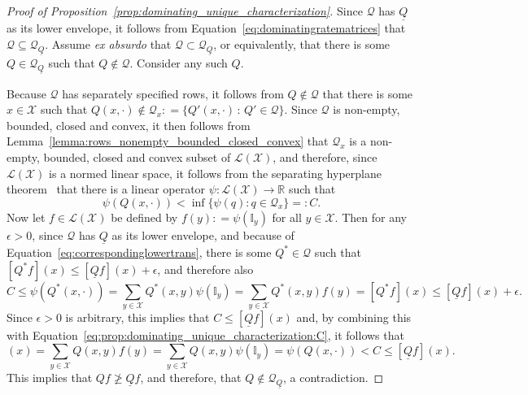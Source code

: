 \documentclass[10pt,a4paper]{paper}
\theoremstyle{definition}
\newcommand{\reals}{\mathbb{R}}
\newcommand{\states}{\mathcal{X}}
\newcommand{\gambles}{\mathcal{L}}
\newcommand{\gamblesX}{\gambles(\states)}
\newcommand{\ind}[1]{\mathbb{I}_{#1}}
\newcommand{\rateset}{\mathcal{Q}}
\newcommand{\lrate}{\underline{Q}}
\newcommand{\coloneqq}{:\!=}
\begin{document}
\begin{proof}[Proof of Proposition~\ref{prop:dominating_unique_characterization}]
Since $\rateset$ has $\lrate$ as its lower envelope, it follows from Equation~\eqref{eq:dominatingratematrices} that $\rateset\subseteq\rateset_{\lrate}$. Assume \emph{ex absurdo} that $\rateset\subset\rateset_{\lrate}$, or equivalently, that there is some $Q\in\rateset_{\lrate}$ such that $Q\notin\rateset$. Consider any such $Q$.

Because $\rateset$ has separately specified rows, it follows from $Q\notin\rateset$ that there is some $x\in\states$ such that $Q(x,\cdot)\notin\rateset_x\coloneqq\{Q'(x,\cdot)\,:\,Q'\in\rateset\}$. Since $\rateset$ is non-empty, bounded, closed and convex, it then follows from Lemma~\ref{lemma:rows_nonempty_bounded_closed_convex} that $\rateset_x$ is a non-empty, bounded, closed and convex subset of $\gamblesX$, and therefore, since $\gamblesX$ is a normed linear space, it follows from the separating hyperplane theorem~\cite[Chapter 14, Corollary 25]{Royden:2010vn} that there is a linear operator $\psi\colon\gamblesX\to\reals$ such that
\begin{equation}\label{eq:prop:dominating_unique_characterization:C}
\psi(Q(x,\cdot))<\inf\{\psi(q)\colon q\in\rateset_x\}=\colon C.
\end{equation}
Now let $f\in\gamblesX$ be defined by $f(y)\coloneqq\psi(\ind{y})$ for all $y\in\states$. Then for any $\epsilon>0$, since $\rateset$ has $\lrate$ as its lower envelope, and because of Equation~\eqref{eq:correspondinglowertrans}, there is some $Q^*\in\rateset$ such that $[Q^*f](x)\leq[\lrate f](x)+\epsilon$, and therefore also
\begin{equation*}
C
\leq\psi(Q^*(x,\cdot))
=\sum_{y\in\states}Q^*(x,y)\psi(\ind{y})
=\sum_{y\in\states}Q^*(x,y)f(y)
=[Q^* f](x)\leq[\lrate f](x)+\epsilon.
\end{equation*}
Since $\epsilon>0$ is arbitrary, this implies that $C\leq[\lrate f](x)$ and, by combining this with Equation~\eqref{eq:prop:dominating_unique_characterization:C}, it follows that
\begin{equation*}
[Qf](x)
=\sum_{y\in\states}Q(x,y)f(y)
=\sum_{y\in\states}Q(x,y)\psi(\ind{y})
=\psi(Q(x,\cdot))
<C\leq[\lrate f](x).
\end{equation*}
This implies that $Qf\not\geq\lrate f$, and therefore, that $Q\notin\rateset_{\lrate}$, a contradiction.

\end{proof}
\end{document}
